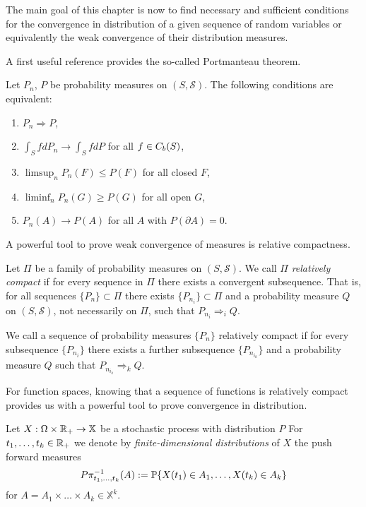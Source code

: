The main goal of this chapter is now to find necessary and sufficient conditions
for the convergence in distribution of a given sequence of random variables 
or equivalently the weak convergence of their distribution measures.

A first useful reference provides the so-called Portmanteau theorem.
\begin{theorem} \label{T: portmanteau weak}
	Let $P_n$, $P$ be probability measures on $(S, \mathcal{S})$.
	The following conditions are equivalent:
	\begin{enumerate}
		\item $P_n \Rightarrow P$,
		\item $\int_S fdP_n \rightarrow \int_S fdP$ for all $f \in C_b(S)$,
		\item $\limsup_n P_n(F) \leq P(F)$ for all closed $F$,
		\item $\liminf_n P_n(G) \geq P(G)$ for all open $G$,
		\item $P_n(A) \rightarrow P(A)$ for all $A$ with $P(\partial A) = 0$.
	\end{enumerate}
\end{theorem}

A powerful tool to prove weak convergence of measures is relative compactness.

\begin{definition} \label{D: rel compactness}
	Let $\Pi$ be a family of probability measures on $(S, \mathcal{S})$.
	We call $\Pi$ \emph{relatively compact} if for every sequence in $\Pi$ there exists a convergent subsequence.
	That is, for all sequences $\{P_n\} \subset \Pi$ there exists $\{P_{n_i} \} \subset \Pi$
	and a probability measure $Q$ on $(S, \mathcal{S})$, not necessarily on $\Pi$,
	such that $P_{n_i} \Rightarrow_i Q$.
	
	We call a sequence of probability measures $\{P_n\}$ relatively compact if
	for every subsequence $\{P_{n_i}\}$ there exists a further subsequence
	$\{P_{n_{i_k}}\}$ and a probability measure $Q$ such that
	$P_{n_{i_k}} \Rightarrow_k Q$.
\end{definition}

For function spaces, knowing that a sequence of functions is relatively compact
provides us with a powerful tool to prove convergence in distribution.

\begin{definition} \label{D: fidi distributions}
	Let $X: \Omega \times \mathbb{R}_+ \rightarrow \mathbb{X}$ be a stochastic process with distribution $P$
	For $t_1, \dots, t_k \in \mathbb{R}_+$ we denote by \emph{finite-dimensional distributions} of $X$ 
	the push forward measures 
	\begin{equation}
		P\pi^{-1}_{t_1, \dots, t_k}(A) := \mathbb{P}\{ X(t_1) \in A_1, \dots, X(t_k) \in A_k \}
	\end{equation}
	for $A = A_1 \times \dots \times A_k \in \mathbb{X}^k$.
\end{definition}

